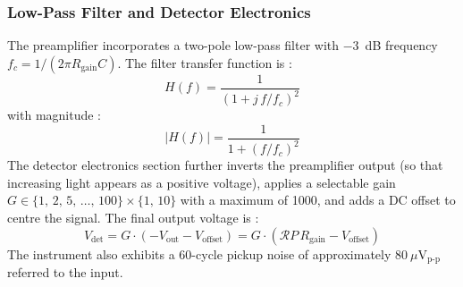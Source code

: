 \subsubsection*{Low-Pass Filter and Detector Electronics}

The preamplifier incorporates a two-pole low-pass filter with $-3$~dB frequency
$f_c = 1/(2\pi R_{\text{gain}} C)$. The filter transfer function is :
\begin{equation}
    H(f) = \frac{1}{\left(1 + j\,f/f_c\right)^2}
\end{equation}
with magnitude :
\begin{equation}
    |H(f)| = \frac{1}{1 + (f/f_c)^2}
\end{equation}
The detector electronics section further inverts the preamplifier output (so that
increasing light appears as a positive voltage), applies a selectable gain
$G \in \{1,\,2,\,5,\,\ldots,\,100\} \times \{1,\,10\}$ with a maximum of 1000, and
adds a DC offset to centre the signal. The final output voltage is :
\begin{equation}
    V_{\text{det}} = G\cdot\left(-V_{\text{out}} - V_{\text{offset}}\right)
                   = G\cdot\left(\mathcal{R}P\,R_{\text{gain}} - V_{\text{offset}}\right)
\end{equation}
The instrument also exhibits a 60-cycle pickup noise of approximately
$80\ \mu\text{V}_{\text{p-p}}$ referred to the input.
